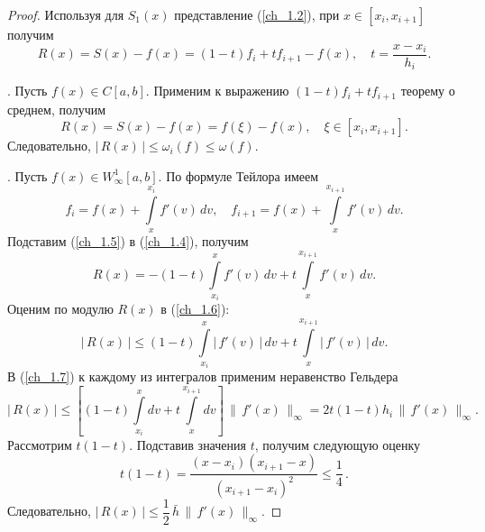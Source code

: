﻿\documentclass[a4paper,14pt]{extreport}
\newcommand{\RNumb}[1]{\uppercase\expandafter{\romannumeral #1\relax}}
\begin{document}
    \begin{proof}
        Используя для $S_1(x)$ представление (\ref{ch_1.2}), при $x\in[x_i,x_{i+1}]$ получим
        \begin{equation}
            \label{ch_1.4}
            R(x)=S(x)-f(x)=(1-t)f_i+tf_{i+1}-f(x),\quad t=\dfrac{x-x_i}{h_i}.
        \end{equation}
        \par\RNumb{1}. Пусть $f(x)\in C[a,b]$. Применим к выражению $(1-t)f_i+tf_{i+1}$ теорему о среднем, получим
        \begin{equation*}
            R(x)=S(x)-f(x)=f(\xi)-f(x),\quad \xi\in[x_i,x_{i+1}].
        \end{equation*}
        Следовательно, $|\,R(x)\,|\leqslant\omega_i(f)\leqslant\omega(f)$.
        \par\vspace{3mm}\RNumb{2}. Пусть $f(x)\in W_\infty^1[a,b]$. По формуле Тейлора имеем
        \begin{equation}
            \label{ch_1.5}
            f_i=f(x)+\int\limits_x^{x_i}f'(v)\,dv,\quad f_{i+1}=f(x)+\int\limits_x^{x_{i+1}}f'(v)\,dv.
        \end{equation}
        Подставим (\ref{ch_1.5}) в (\ref{ch_1.4}), получим
        \begin{equation}
            \label{ch_1.6}
            R(x)=-(1-t)\int\limits_{x_i}^xf'(v)\,dv +t\int\limits_x^{x_{i+1}}f'(v)\,dv.
        \end{equation}
        Оценим по модулю $R(x)$ в (\ref{ch_1.6}):
        \begin{equation}
            \label{ch_1.7}
            |\,R(x)\,|\leqslant(1-t)\int\limits_{x_i}^x|\,f'(v)\,|\,dv +t\int\limits_x^{x_{i+1}}|\,f'(v)\,|\,dv.
        \end{equation}
        В (\ref{ch_1.7}) к каждому из интегралов применим неравенство Гельдера 
        \begin{equation}
            \label{ch_1.8}
            |\,R(x)\,|\leqslant\left[(1-t)\int\limits_{x_i}^xdv +t\int\limits_x^{x_{i+1}}dv\right]\,\|\,f'(x)\,\|_\infty=2t(1-t)h_i\,\|\,f'(x)\,\|_\infty.
        \end{equation}
        Рассмотрим $t(1-t)$. Подставив значения $t$, получим следующую оценку
        \begin{equation*}
            t(1-t)=\dfrac{(x-x_i)(x_{i+1}-x)}{(x_{i+1}-x_i)^2}\leqslant\dfrac14\,.
        \end{equation*}
        Следовательно, $|\,R(x)\,|\leqslant\dfrac12\,\bar{h}\,\|\,f'(x)\,\|_\infty$.

\end{proof}
\end{document}
